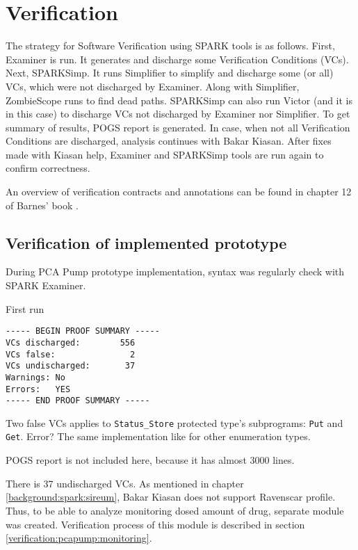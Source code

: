 
\cleardoublepage

\chapter{Verification}
\label{verification}

The strategy for Software Verification using SPARK tools is as follows. First, Examiner is run. It generates and discharge some Verification Conditions (VCs). Next, SPARKSimp. It runs Simplifier to simplify and discharge some (or all) VCs, which were not discharged by Examiner. Along with Simplifier, ZombieScope runs to find dead paths. SPARKSimp can also run Victor (and it is in this case) to discharge VCs not discharged by Examiner nor Simplifier. To get summary of results, POGS report is generated. In case, when not all Verification Conditions are discharged, analysis continues with Bakar Kiasan. After fixes made with Kiasan help, Examiner and SPARKSimp tools are run again to confirm correctness.

An overview of verification contracts and annotations can be found in chapter 12 of Barnes' book \cite{Barnes:Book}.

\section{Verification of implemented prototype}
\label{verification:prototype}

During PCA Pump prototype implementation, syntax was regularly check with SPARK Examiner.

First run
\begin{lstlisting}[frame=single, gobble=0, caption={POGS report for PCA Pump prototype}, label={listing:pcapump_prototype_pogs}]
----- BEGIN PROOF SUMMARY -----
VCs discharged:        556
VCs false:               2
VCs undischarged:       37
Warnings: No
Errors:   YES
----- END PROOF SUMMARY ----- 
\end{lstlisting}

Two false VCs applies to \lstinline{Status_Store} protected type's subprograms: \lstinline{Put} and \lstinline{Get}.
Error? The same implementation like for other enumeration types.

POGS report is not included here, because it has almost 3000 lines.

There is 37 undischarged VCs. As mentioned in chapter \ref{background:spark:sireum}, Bakar Kiasan does not support Ravenscar profile. Thus, to be able to analyze monitoring dosed amount of drug, separate module was created. Verification process of this module is described in section \ref{verification:pcapump:monitoring}.



